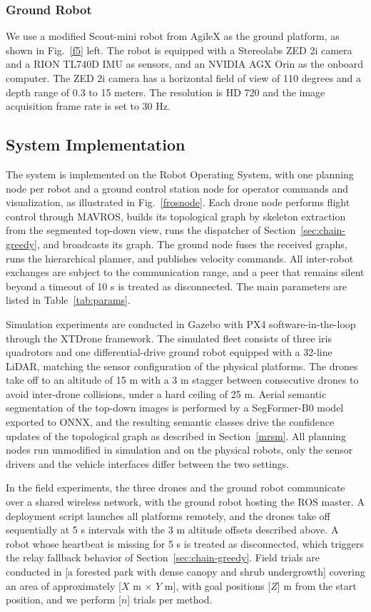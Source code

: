\subsubsection{Ground Robot} We use a modified Scout-mini robot from AgileX as the ground platform, as shown in Fig.~\ref{f5} left. The robot is equipped with a Stereolabs ZED 2i camera and a RION TL740D IMU as sensors, and an NVIDIA AGX Orin as the onboard computer. The ZED 2i camera has a horizontal field of view of 110 degrees and a depth range of 0.3 to 15 meters. The resolution is HD 720 and the image acquisition frame rate is set to 30 Hz.

\subsection{System Implementation}
\label{sec:sys-impl}

The system is implemented on the Robot Operating System, with one planning node per robot and a ground control station node for operator commands and visualization, as illustrated in Fig.~\ref{frosnode}. Each drone node performs flight control through MAVROS, builds its topological graph by skeleton extraction from the segmented top-down view, runs the dispatcher of Section~\ref{sec:chain-greedy}, and broadcasts its graph. The ground node fuses the received graphs, runs the hierarchical planner, and publishes velocity commands. All inter-robot exchanges are subject to the communication range, and a peer that remains silent beyond a timeout of 10 s is treated as disconnected. The main parameters are listed in Table~\ref{tab:params}.

Simulation experiments are conducted in Gazebo with PX4 software-in-the-loop through the XTDrone framework. The simulated fleet consists of three iris quadrotors and one differential-drive ground robot equipped with a 32-line LiDAR, matching the sensor configuration of the physical platforms. The drones take off to an altitude of 15 m with a 3 m stagger between consecutive drones to avoid inter-drone collisions, under a hard ceiling of 25 m. Aerial semantic segmentation of the top-down images is performed by a SegFormer-B0 model exported to ONNX, and the resulting semantic classes drive the confidence updates of the topological graph as described in Section~\ref{mrsm}. All planning nodes run unmodified in simulation and on the physical robots, only the sensor drivers and the vehicle interfaces differ between the two settings.

In the field experiments, the three drones and the ground robot communicate over a shared wireless network, with the ground robot hosting the ROS master. A deployment script launches all platforms remotely, and the drones take off sequentially at 5 s intervals with the 3 m altitude offsets described above. A robot whose heartbeat is missing for 5 s is treated as disconnected, which triggers the relay fallback behavior of Section~\ref{sec:chain-greedy}. Field trials are conducted in [a forested park with dense canopy and shrub undergrowth] covering an area of approximately [$X$ m $\times$ $Y$ m], with goal positions [$Z$] m from the start position, and we perform [$n$] trials per method.

